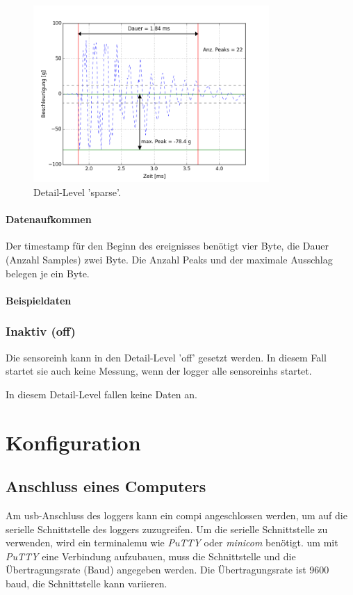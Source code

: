 \begin{figure}
	\centering
		\includegraphics[width=0.8\textwidth]{images/sparse.png}
	\caption{Detail-Level 'sparse'.}
	\label{fig.detailsparse}
\end{figure}

\paragraph{Datenaufkommen} Der \gls{timestamp} für den Beginn des \gls{ereignis}ses benötigt vier Byte, die Dauer (Anzahl Samples) zwei Byte. Die Anzahl Peaks und der maximale Ausschlag belegen je ein Byte.

\paragraph{Beispieldaten} 

\subsubsection{Inaktiv (off)}
Die \gls{sensoreinh} kann in den Detail-Level 'off' gesetzt werden. In diesem Fall startet sie auch keine Messung, wenn der \gls{logger} alle \glspl{sensoreinh} startet.

In diesem Detail-Level fallen keine Daten an.


\section{Konfiguration}\label{sec.manualkonfig}


\subsection{Anschluss eines Computers}\label{ssec.manualserial}
Am \gls{usb}-Anschluss des \gls{logger}s kann ein \gls{compi} angeschlossen werden, um auf die serielle Schnittstelle des \gls{logger}s zuzugreifen. Um die serielle Schnittstelle zu verwenden, wird ein \gls{terminalemu} wie \emph{PuTTY} oder \emph{minicom} benötigt. um mit \emph{PuTTY} eine Verbindung aufzubauen, muss die Schnittstelle und die Übertragungsrate (Baud) angegeben werden. Die Übertragungsrate ist 9600 baud, die Schnittstelle kann variieren. 

